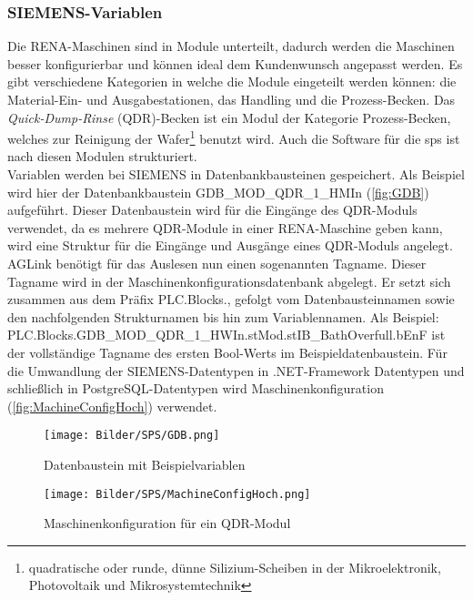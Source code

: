 \subsubsection{SIEMENS-Variablen}
Die RENA-Maschinen sind in Module unterteilt, dadurch werden die Maschinen besser konfigurierbar und können ideal dem Kundenwunsch angepasst werden. Es gibt verschiedene Kategorien in welche die Module eingeteilt werden können: die Material-Ein- und Ausgabestationen, das Handling und die Prozess-Becken. Das \textit{Quick-Dump-Rinse} (QDR)-Becken ist ein Modul der Kategorie Prozess-Becken, welches zur Reinigung der Wafer\footnote[1]{quadratische oder runde, dünne Silizium-Scheiben in der Mikroelektronik, Photovoltaik und Mikrosystemtechnik} benutzt wird. Auch die Software für die \ac{sps} ist nach diesen Modulen strukturiert.
\ \\
Variablen werden bei SIEMENS in Datenbankbausteinen gespeichert. Als Beispiel wird hier der Datenbankbaustein \glqq GDB\_{}MOD\_{}QDR\_{}1\_{}HMIn\grqq{} (\autoref{fig:GDB}) aufgeführt.  Dieser Datenbaustein wird für die Eingänge des QDR-Moduls verwendet, da es mehrere QDR-Module in einer RENA-Maschine geben kann, wird eine Struktur für die Eingänge und Ausgänge eines QDR-Moduls angelegt. AGLink benötigt für das Auslesen nun einen sogenannten Tagname. Dieser Tagname wird in der Maschinenkonfigurationsdatenbank abgelegt. Er setzt sich zusammen aus dem Präfix \glqq PLC.Blocks.\grqq{}, gefolgt vom Datenbausteinnamen sowie den nachfolgenden Strukturnamen bis hin zum Variablennamen. Als Beispiel: 
\ \\
PLC.Blocks.GDB\_{}MOD\_{}QDR\_{}1\_{}HWIn.stMod.stIB\_{}BathOverfull.bEnF ist der vollständige Tagname des ersten Bool-Werts im Beispieldatenbaustein. Für die Umwandlung der SIEMENS-Datentypen in .NET-Framework Datentypen und schließlich in PostgreSQL-Datentypen wird Maschinenkonfiguration (\autoref{fig:MachineConfigHoch}) verwendet.



\begin{figure}
\centering
 \texttt{[image: Bilder/SPS/GDB.png]}
 \caption[Datenbaustein mit Beispielvariablen]{Datenbaustein mit Beispielvariablen}
 \label{fig:GDB}
\end{figure}

\begin{figure}
\centering
 \texttt{[image: Bilder/SPS/MachineConfigHoch.png]}
 \caption[Maschinenkonfiguration für ein QDR-Modul]{Maschinenkonfiguration für ein QDR-Modul}
 \label{fig:MachineConfigHoch}
\end{figure}

